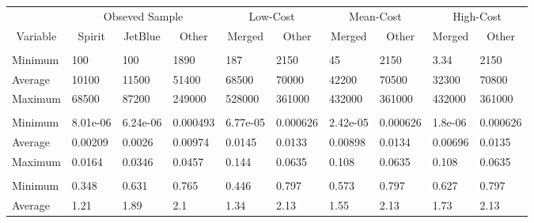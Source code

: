 
\begin{tabular}[t]{llllllllll}
\toprule
\multicolumn{1}{c}{ } & \multicolumn{3}{c}{Obseved Sample} & \multicolumn{2}{c}{Low-Cost} & \multicolumn{2}{c}{Mean-Cost} & \multicolumn{2}{c}{High-Cost} \\
\cmidrule(l{3pt}r{3pt}){2-4} \cmidrule(l{3pt}r{3pt}){5-6} \cmidrule(l{3pt}r{3pt}){7-8} \cmidrule(l{3pt}r{3pt}){9-10}
\multicolumn{1}{c}{Variable} & \multicolumn{1}{c}{Spirit} & \multicolumn{1}{c}{JetBlue} & \multicolumn{1}{c}{Other} & \multicolumn{1}{c}{Merged} & \multicolumn{1}{c}{Other} & \multicolumn{1}{c}{Merged} & \multicolumn{1}{c}{Other} & \multicolumn{1}{c}{Merged} & \multicolumn{1}{c}{Other} \\
\cmidrule(l{3pt}r{3pt}){1-1} \cmidrule(l{3pt}r{3pt}){2-2} \cmidrule(l{3pt}r{3pt}){3-3} \cmidrule(l{3pt}r{3pt}){4-4} \cmidrule(l{3pt}r{3pt}){5-5} \cmidrule(l{3pt}r{3pt}){6-6} \cmidrule(l{3pt}r{3pt}){7-7} \cmidrule(l{3pt}r{3pt}){8-8} \cmidrule(l{3pt}r{3pt}){9-9} \cmidrule(l{3pt}r{3pt}){10-10}
\addlinespace[0.3em]
\multicolumn{10}{l}{\textbf{Passengers}}\\
\hspace{1em}Minimum & 100 & 100 & 1890 & 187 & 2150 & 45 & 2150 & 3.34 & 2150\\
\hspace{1em}Average & 10100 & 11500 & 51400 & 68500 & 70000 & 42200 & 70500 & 32300 & 70800\\
\hspace{1em}Maximum & 68500 & 87200 & 249000 & 528000 & 361000 & 432000 & 361000 & 432000 & 361000\\
\addlinespace[0.3em]
\multicolumn{10}{l}{\textbf{Market Share}}\\
\hspace{1em}Minimum & 8.01e-06 & 6.24e-06 & 0.000493 & 6.77e-05 & 0.000626 & 2.42e-05 & 0.000626 & 1.8e-06 & 0.000626\\
\hspace{1em}Average & 0.00209 & 0.0026 & 0.00974 & 0.0145 & 0.0133 & 0.00898 & 0.0134 & 0.00696 & 0.0135\\
\hspace{1em}Maximum & 0.0164 & 0.0346 & 0.0457 & 0.144 & 0.0635 & 0.108 & 0.0635 & 0.108 & 0.0635\\
\addlinespace[0.3em]
\multicolumn{10}{l}{\textbf{Prices}}\\
\hspace{1em}Minimum & 0.348 & 0.631 & 0.765 & 0.446 & 0.797 & 0.573 & 0.797 & 0.627 & 0.797\\
\hspace{1em}Average & 1.21 & 1.89 & 2.1 & 1.34 & 2.13 & 1.55 & 2.13 & 1.73 & 2.13\\

\end{tabular}
